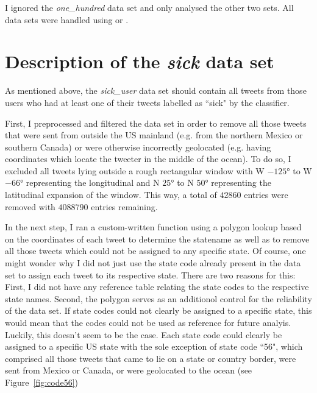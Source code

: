 \documentclass[11pt, a4paper,twoside]{report}\usepackage[]{graphicx}\usepackage[]{color}
\begin{document}
I ignored the \textit{one\_hundred} data set and only analysed the other two sets. All data sets were handled using  or .

\section{Description of the \textit{sick} data set}
\label{sec:sick_user_exploratory}



As mentioned above, the \textit{sick\_user} data set should contain all tweets from those users who had at least one of their tweets labelled as ``sick" by the classifier.\newline

First, I preprocessed and filtered the data set in order to remove all those tweets that were sent from outside the US mainland (e.g. from the northern Mexico or southern Canada) or were otherwise incorrectly geolocated (e.g. having coordinates which locate the tweeter in the middle of the ocean). To do so, I excluded all tweets lying outside a rough rectangular window with W $-125°$ to W $-66°$ representing the longitudinal and N $25°$ to N $50°$ representing the latitudinal expansion of the window. This way, a total of $42860$ entries were removed with $4088790$ entries remaining.\newline

In the next step, I ran a custom-written function using a polygon lookup based on the coordinates of each tweet to determine the statename as well as to remove all those tweets which could not be assigned to any specific state. Of course, one might wonder why I did not just use the state code already present in the data set to assign each tweet to its respective state. There are two reasons for this: First, I did not have any reference table relating the state codes to the respective state names. Second, the polygon serves as an additionol control for the reliability of the data set. If state codes could not clearly be assigned to a specific state, this would mean that the codes could not be used as reference for future analyis. Luckily, this doesn't seem to be the case. Each state code could clearly be assigned to a specific US state with the sole exception of state code ``56", which comprised all those tweets that came to lie on a state or country border, were sent from Mexico or Canada, or were geolocated to the ocean (see Figure~\ref{fig:code56})\newline
\end{document}
